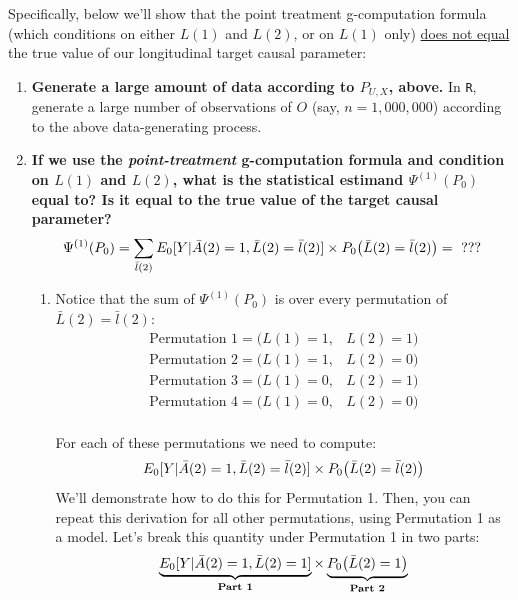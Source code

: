 \documentclass{exam}
\begin{document}
\noindent Specifically, below we'll show that the point treatment g-computation formula (which conditions on either $L(1)$ and $L(2)$, or on $L(1)$ only) \underline{does not equal} the true value of our longitudinal target causal parameter:

\vspace{2mm}

\begin{enumerate}
\item \textbf{Generate a large amount of data according to $P_{U,X}$, above.} In \texttt{R}, generate a large number of observations of $O$ (say, $n = 1,000,000$) according to the above data-generating process. 

\item \textbf{If we use the \textit{point-treatment} g-computation formula and condition on $L(1)$ and $L(2)$, what is the statistical estimand $\Psi^{(1)}(P_0)$ equal to? Is it equal to the true value of the target causal parameter?}
\[
\Psi^{(1)}(P_0) = \sum_{\bar{l}(2)}E_0[Y|\bar{A}(2) = 1, \bar{L}(2) = \bar{l}(2)] \times P_0\big{(}\bar{L}(2) = \bar{l}(2)\big{)} = \text{ ???}
\]
\begin{enumerate}
\item Notice that the sum of $\Psi^{(1)}(P_0)$ is over every permutation of $\bar{L}(2) = \bar{l}(2)$: 
\begin{align*}
\text{Permutation 1} = (L(1) = 1, &L(2) = 1) \\
\text{Permutation 2} = (L(1) = 1, &L(2) = 0) \\
\text{Permutation 3} = (L(1) = 0, &L(2) = 1) \\
\text{Permutation 4} = (L(1) = 0, &L(2) = 0) \\
\end{align*}

For each of these permutations we need to compute: 
$$E_0[Y|\bar{A}(2) = 1, \bar{L}(2) = \bar{l}(2)] \times P_0\big{(}\bar{L}(2) = \bar{l}(2)\big{)}$$ 
We'll demonstrate how to do this for Permutation 1. Then, you can repeat this derivation for all other permutations, using Permutation 1 as a model. Let's break this quantity under Permutation 1 in two parts:
$$\underbrace{E_0[Y|\bar{A}(2) = 1, \bar{L}(2) = 1]}_\text{\textbf{Part 1}} \times \underbrace{P_0\big{(}\bar{L}(2) = 1\big{)}}_\text{\textbf{Part 2}}$$



\end{enumerate}
\end{enumerate}
\end{document}
